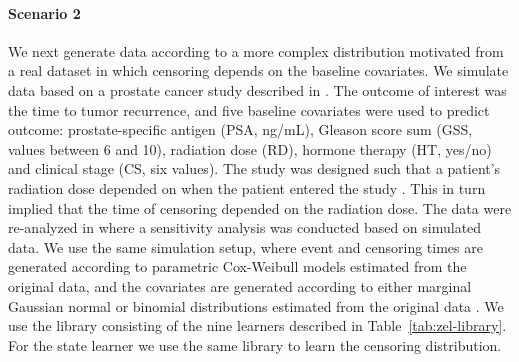 \documentclass[a4,danish]{article}
\begin{document}
\paragraph{Scenario 2}

We next generate data according to a more complex distribution motivated from a
real dataset in which censoring depends on the baseline covariates. We simulate
data based on a prostate cancer study described in
\citep{kattan2000pretreatment}. The outcome of interest was the time to tumor
recurrence, and five baseline covariates were used to predict outcome:
prostate-specific antigen (PSA, ng/mL), Gleason score sum (GSS, values between 6
and 10), radiation dose (RD), hormone therapy (HT, yes/no) and clinical stage
(CS, six values). The study was designed such that a patient's radiation dose
depended on when the patient entered the study \citep{gerds2013estimating}. This
in turn implied that the time of censoring depended on the radiation dose.
The data were re-analyzed in \citep{gerds2013estimating} where a sensitivity
analysis was conducted based on simulated data. We use the same simulation
setup, where event and censoring times are generated according to parametric
Cox-Weibull models estimated from the original data, and the covariates are
generated according to either marginal Gaussian normal or binomial distributions
estimated from the original data
\citep[c.f.,][Section~4.6]{gerds2013estimating}. We use the library consisting
of the nine learners described in Table~\ref{tab:zel-library}. For the state
learner we use the same library to learn the censoring distribution.
\end{document}
